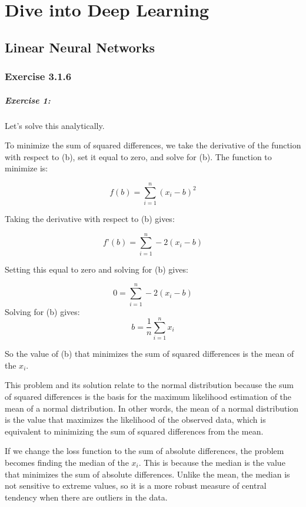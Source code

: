 \chapter{Dive into Deep Learning}\label{chp:dive-into-deep-learning}

\section{Linear Neural Networks} %
\label{sec:Linear Neural Networks}

\subsection{Exercise 3.1.6}

\paragraph{Exercise 1:}

Let’s solve this analytically.

To minimize the sum of squared differences, we take the derivative of the function with respect to (b), set it equal to zero, and solve for (b).
The function to minimize is:

\[
f(b) = \sum_{i=1}^{n} (x_i - b)^2
\]

Taking the derivative with respect to (b) gives:

$$
f’(b) = \sum_{i=1}^{n} -2(x_i - b)
$$

Setting this equal to zero and solving for (b) gives:

$$
0 = \sum_{i=1}^{n} -2(x_i - b)
$$
Solving for (b) gives:
$$
b = \frac{1}{n} \sum_{i=1}^{n} x_i
$$

So the value of (b) that minimizes the sum of squared differences is the mean of the \(x_i\).

This problem and its solution relate to the normal distribution because the sum of squared differences is the basis for the maximum likelihood estimation of the mean of a normal distribution.
In other words, the mean of a normal distribution is the value that maximizes the likelihood of the observed data, which is equivalent to minimizing the sum of squared differences from the mean.


If we change the loss function to the sum of absolute differences, the problem becomes finding the median of the \(x_i\).
This is because the median is the value that minimizes the sum of absolute differences.
Unlike the mean, the median is not sensitive to extreme values, so it is a more robust measure of central tendency when there are outliers in the data.

